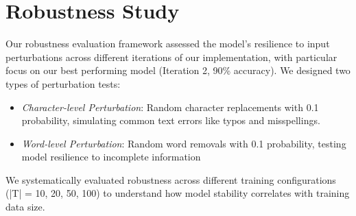 \documentclass[11pt,a4paper]{article}
\begin{document}
\section{Robustness Study}
Our robustness evaluation framework assessed the model's resilience to input perturbations across different iterations of our implementation, with particular focus on our best performing model (Iteration 2, 90\% accuracy). We designed two types of perturbation tests:
\begin{itemize}[topsep=0pt]
  \item \textit{Character-level Perturbation}: Random character replacements with 0.1 probability, simulating common text errors like typos and misspellings.
  \item \textit{Word-level Perturbation}: Random word removals with 0.1 probability, testing model resilience to incomplete information
\end{itemize}
We systematically evaluated robustness across different training configurations (|T| = 10, 20, 50, 100) to understand how model stability correlates with training data size.
\end{document}
